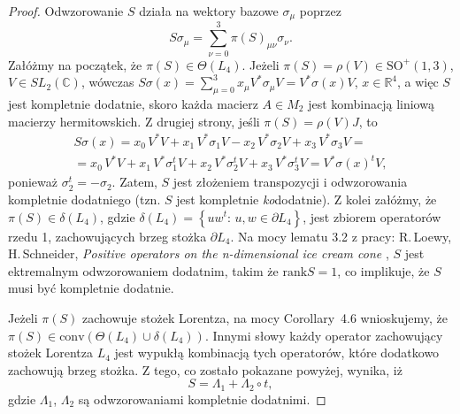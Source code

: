 \begin{proof}
\label{RandomLabel:875919}
  Odwzorowanie $S$ działa na wektory bazowe $\sigma_{\mu}$ poprzez
\begin{equation}
 S \sigma_{\mu} = \sum_{\nu = 0}^{3} \pi(S)_{\mu \nu} \sigma_{\nu}.
\end{equation}
Załóżmy na początek, że $\pi(S) \in \Theta(L_{4})$.
Jeżeli $\pi(S) = \rho(V) \in \text{SO}^{+}(1,3)$,
$V \in SL_{2}(\mathbb{C})$,
wówczas
$S \sigma(x) = \sum_{\mu = 0}^{3}  x_{\mu} V^{*} \sigma_{\mu} V =
 V^{*} \sigma(x) V$,
 $x \in \mathbb{R}^{4}$,
a więc $S$ jest kompletnie dodatnie,
skoro każda macierz $A \in M_{2}$ jest kombinacją liniową macierzy hermitowskich.
Z drugiej strony,
jeśli $\pi(S) = \rho(V) J$,
to
\begin{multline}
\label{RandomLabel:830200}
S \sigma(x) =
  x_{0} \, V^{*}V + x_{1} \, V^{*} \sigma_{1} V -
  x_{2} \, V^{*} \sigma_{2} V +
  x_{3} \, V^{*} \sigma_{3} V = \\
  = x_{0} \, V^{*}V + x_{1} \, V^{*} \sigma_{1}^{t} V +
  x_{2} \, V^{*} \sigma_{2}^{t} V +
  x_{3} \, V^{*} \sigma_{3}^{t} V =
  V^{*} \sigma(x)^{t} V,
\end{multline}
ponieważ $\sigma_{2}^{t} = - \sigma_{2}$.
Zatem, $S$ jest złożeniem transpozycji i odwzorowania kompletnie dodatniego
(tzn. $S$  jest kompletnie \emph{ko}dodatnie).
Z kolei załóżmy, że $\pi(S) \in \delta(L_{4})$,
gdzie
$
 \delta(L_{4}) = \left \{ u w^{t}:
 \, u, w \in \partial L_{4}  \right \}
$,
jest zbiorem operatorów rzedu 1, zachowujących brzeg stożka $\partial L_{4}$.
Na mocy  lematu 3.2 z pracy:
R.\,Loewy, H.\,Schneider,
\emph{Positive operators on the n-dimensional ice cream cone}
\cite{loewy1975positive},
$S$ jest ektremalnym odwzorowaniem dodatnim, takim że $\text{rank} S = 1$,
co implikuje, że $S$ musi być kompletnie dodatnie.

Jeżeli $\pi(S)$ zachowuje stożek Lorentza,
na mocy \mbox{Corollary 4.6} \cite{loewy1975positive} wnioskujemy, że
$\pi(S) \in \text{conv} \left ( \Theta(L_{4}) \cup \delta(L_{4}) \right)$.
Innymi słowy każdy operator zachowujący stożek Lorentza $L_{4}$
jest wypukłą kombinacją tych operatorów, które dodatkowo zachowują brzeg stożka.
Z tego, co zostało pokazane powyżej, wynika, iż
\begin{equation}
\label{RandomLabel:587827}
    S = \Lambda_{1} + \Lambda_{2} \circ t,
\end{equation}
gdzie $\Lambda_{1}$, $\Lambda_{2}$
są odwzorowaniami kompletnie dodatnimi.
\end{proof}

